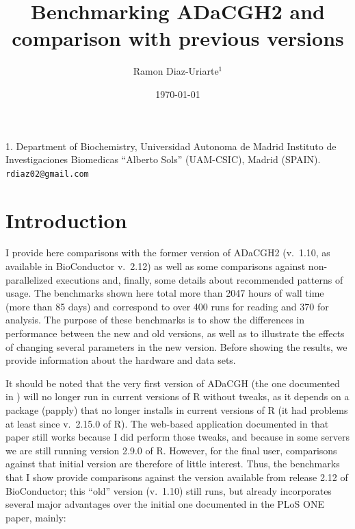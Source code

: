\documentclass[a4paper,11pt]{article}
\title{Benchmarking ADaCGH2 and comparison with previous versions}
\date{\mydate\today}
\author{Ramon Diaz-Uriarte$^{1}$}
\begin{document}
\maketitle

\begin{center}
1. Department of Biochemistry,
Universidad Autonoma de Madrid
Instituto de Investigaciones Biomedicas ``Alberto Sols'' (UAM-CSIC), Madrid
(SPAIN).
{\tt rdiaz02@gmail.com}
\end{center}

\tableofcontents
\listoftables
\listoffigures


\clearpage

\section{Introduction}
I provide here comparisons with the former version of ADaCGH2 (v.\ 1.10,
as available in BioConductor v.\ 2.12) as well as some comparisons against
non-parallelized executions and, finally, some details about recommended
patterns of usage. The benchmarks shown here total more than 2047 hours of
wall time (more than 85 days) and correspond to over 400 runs for reading
and 370 for analysis. The purpose of these benchmarks is to show the
differences in performance between the new and old versions, as well as to
illustrate the effects of changing several parameters in the new
version. Before showing the results, we provide information about the
hardware and data sets.



It should be noted that the very first version of ADaCGH (the one
documented in \cite{Diaz-Uriarte2007}) will no longer run in current
versions of R without tweaks, as it depends on a package (papply) that no
longer installs in current versions of R (it had problems at least since
v.\ 2.15.0 of R). The web-based application documented in that paper still
works because I did perform those tweaks, and because in some servers we
are still running version 2.9.0 of R. However, for the final user,
comparisons against that initial version are therefore of little
interest. Thus, the benchmarks that I show provide comparisons against the
version available from release 2.12 of BioConductor; this ``old'' version
(v.\ 1.10) still runs, but already incorporates several major advantages
over the initial one documented in the PLoS ONE paper, mainly:
\end{document}
